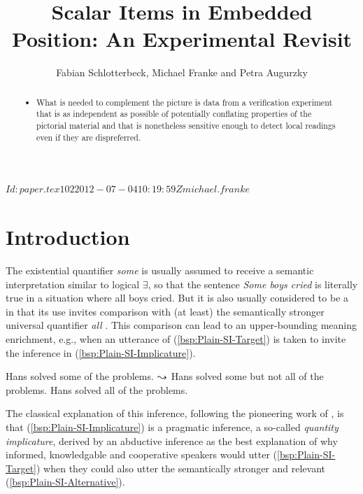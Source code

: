 \documentclass[fleqn,reqno,10pt,draft]{article}
\title{Scalar Items in Embedded Position: {A}n Experimental Revisit}
\author{Fabian Schlotterbeck, Michael Franke and Petra Augurzky}
\date{}
\begin{document}
\maketitle



\begin{abstract}
  \begin{itemize}
  \item What is needed to complement the picture is data from a
    verification experiment that is as independent as possible of
    potentially conflating properties of the pictorial material and
    that is nonetheless sensitive enough to detect local readings even
    if they are dispreferred.
  \end{itemize}

\end{abstract}

\tableofcontents

\svnInfo $Id: paper.tex 102 2012-07-04 10:19:59Z michael.franke $

\section{Introduction}
\label{sec:introduction}

The existential quantifier \emph{some} is usually assumed to receive a
semantic interpretation similar to logical $\exists$, so that the
sentence \emph{Some boys cried} is literally true in a situation where
all boys cried. But it is also usually considered to be a
 in that its use invites comparison with (at
least) the semantically stronger universal quantifier \emph{all}
\citep[c.f.][]{Horn1972:On-the-Semantic,Gazdar1979:Pragmatics:-Imp,AtlasLevinson1981}. This
comparison can lead to an upper-bounding meaning enrichment, e.g.,
when an utterance of (\ref{bsp:Plain-SI-Target}) is taken to invite
the inference in (\ref{bsp:Plain-SI-Implicature}).

\begin{exe}
  \ex \label{bsp:Plain-SI}
    \begin{xlist}
      \ex \label{bsp:Plain-SI-Target} Hans solved some of the
        problems.
      \ex \label{bsp:Plain-SI-Implicature} $\leadsto$ Hans solved
        some but not all of the problems.
      \ex \label{bsp:Plain-SI-Alternative} Hans solved all of the problems.
    \end{xlist}
\end{exe}

\noindent The classical explanation of this inference, following the
pioneering work of \citet{Grice1975:Logic-and-Conve} \citep[see][for
recent overview]{Geurts2010:Quantity-Implic}, is that
(\ref{bsp:Plain-SI-Implicature}) is a pragmatic inference, a so-called
\emph{quantity implicature}, derived by an abductive inference as the
best explanation of why informed, knowledgable and cooperative
speakers would utter (\ref{bsp:Plain-SI-Target}) when they could also
utter the semantically stronger and relevant
(\ref{bsp:Plain-SI-Alternative}).
\end{document}
